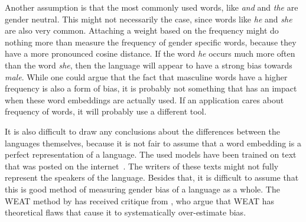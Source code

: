 Another assumption is that the most commonly used words, like \textit{and} and \textit{the}
are gender neutral. This might not necessarily the case, since words like \textit{he} and
\textit{she} are also very common. Attaching a weight based on the frequency might do
nothing more than measure the frequency of gender specific words, because they have a
more pronounced cosine distance. If the word \textit{he} occurs much more often than
the word \textit{she}, then the language will appear to have a strong bias towards
\textit{male}. While one could argue that the fact that masculine words have a higher
frequency is also a form of bias, it is probably not something that has an impact when
these word embeddings are actually used. If an application cares about frequency of words,
it will probably use a different tool.

It is also difficult to draw any conclusions about the differences between the languages
themselves, because it is not fair to assume that a word embedding is a perfect
representation of a language. The used models have been trained on text that was 
posted on the internet~\parencite{grave2018learning}. The writers of these texts might
not fully represent the speakers of the language.
Besides that, it is difficult to assume that this is
good method of measuring gender bias of a language as a whole. The WEAT method by
\textcite{caliskan_2017_semantics_language_corpora} has received critique from
\textcite{ethayarajh-etal-2019-understanding}, who argue that WEAT has theoretical flaws 
that cause it to systematically over-estimate bias.
